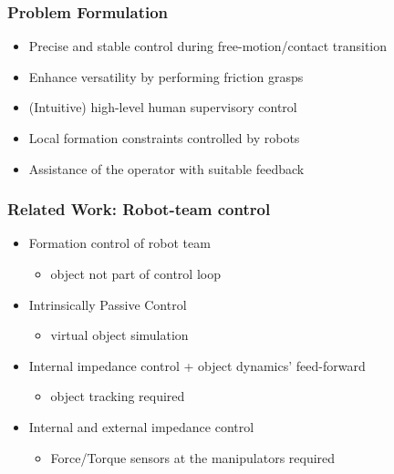 \documentclass[student]{ITRslides}
\begin{document}
\begin{frame}
	\frametitle{Problem Formulation}

	\begin{itemize}
		\item Precise and stable control during free-motion/contact transition
		\item Enhance versatility by performing friction grasps
		\item (Intuitive) high-level human supervisory control
		\item Local formation constraints controlled by robots
		\item Assistance of the operator with suitable feedback
	\end{itemize}

\end{frame}

\begin{frame}
	\frametitle{Related Work: Robot-team control}
	\begin{itemize}
		\item Formation control of robot team \cite{Sieber_15,Wimboeck_06}
		\begin{itemize}
			\item object not part of control loop
		\end{itemize}
		\item Intrinsically Passive Control \cite{Stramigioli_01, Wimboeck_08}
		\begin{itemize}
			\item virtual object simulation
		\end{itemize}
		\item Internal impedance control + object dynamics' feed-forward \cite{DePascali_15}
				\begin{itemize}
			\item object tracking required
		\end{itemize}
		\item Internal and external impedance control \cite{Caccavale_01,Caccavale_08}
			\begin{itemize}
			\item Force/Torque sensors at the manipulators required
			\end{itemize}
	\end{itemize}
\end{frame}
\end{document}
